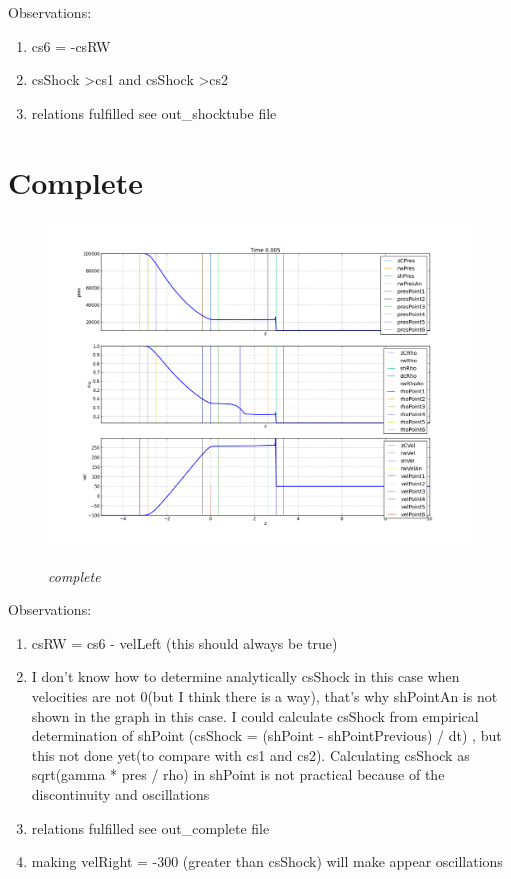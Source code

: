 \documentclass[12pt]{book}
\begin{document}
Observations:
\begin{enumerate}
\item cs6 = -csRW
\item csShock \textgreater cs1 and csShock \textgreater cs2
\item relations fulfilled see out\_shocktube file
\end{enumerate}


\section*{Complete}

\begin{figure}[!h]
 \centering
 \includegraphics[scale=0.4]{complete.png}
 \label{Fig: 1}
	\caption{\emph{complete}}
\end{figure}

Observations:
\begin{enumerate}
\item csRW = cs6 - velLeft (this should always be true)
\item I don't know how to determine analytically csShock in this case when velocities are not 0(but I think there is a way), that's why shPointAn is not shown in the graph in this case. I could calculate csShock from empirical determination of shPoint (csShock = (shPoint - shPointPrevious) / dt) , but this not done yet(to compare with cs1 and cs2). Calculating csShock as sqrt(gamma * pres / rho) in shPoint is not practical because of the discontinuity and oscillations
\item relations fulfilled see out\_complete file
\item making velRight = -300 (greater than csShock) will make appear oscillations
\end{enumerate}
\end{document}
